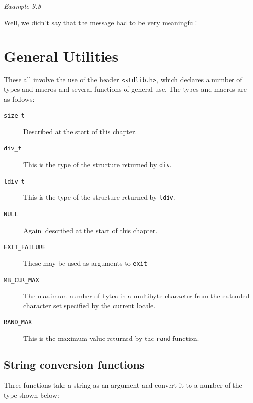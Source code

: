    \begin{center}\textit{Example 9.8}\end{center}


   Well, we didn't say that the message had to be very meaningful!


  

 
        \section{General Utilities}
        

  

  These all involve the use of the header \texttt{<stdlib.h>},
   which declares a number of types and macros and several functions of general
   use.  The types and macros are as follows:


  \begin{description}
   \item[\texttt{size\_t}] Described at the start of this chapter.

   \item[\texttt{div\_t}] This is the type of the structure returned by \texttt{div}.

   \item[\texttt{ldiv\_t}] This is the type of the structure returned by \texttt{ldiv}.

   \item[\texttt{NULL}] Again, described at the start of this chapter.

   \item[\texttt{EXIT\_FAILURE}] These may be used as arguments to \texttt{exit}.

   \item[\texttt{MB\_CUR\_MAX}] The maximum number of bytes in a multibyte character from
    the extended character set specified by the current locale.

   \item[\texttt{RAND\_MAX}] This is the maximum value returned by the \texttt{rand}
    function.
  \end{description}

  \subsection{String conversion functions}
   

   Three functions take a string as an argument and convert it to a number
    of the type shown below:


